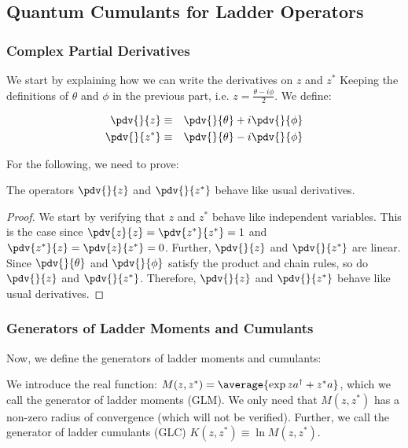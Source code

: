 \subsection{Quantum Cumulants for Ladder Operators}

\subsubsection{Complex Partial Derivatives}

We start by explaining how we can write the derivatives on $z$ and $z^*$ Keeping the definitions of $\theta$ and $\phi$ in the previous part, i.e. $z = \frac{\theta - i \phi}{2}$. We define:

\begin{eqnarray}
    \pdv{}{z} &\equiv& \pdv{}{\theta} + i \pdv{}{\phi}\\
    \pdv{}{z^*} &\equiv& \pdv{}{\theta} - i \pdv{}{\phi}
\end{eqnarray}

For the following, we need to prove:

\begin{theorem}
    The operators $\pdv{}{z}$ and $\pdv{}{z^*}$ behave like usual derivatives.
\end{theorem}

\begin{proof}
    We start by verifying that $z$ and $z^*$ behave like independent variables. This is the case since $\pdv{z}{z} = \pdv{z^*}{z^*} = 1$ and $\pdv{z^*}{z} = \pdv{z}{z^*} = 0$. Further, $\pdv{}{z}$ and $\pdv{}{z^*}$ are linear. Since $\pdv{}{\theta}$ and $\pdv{}{\phi}$ satisfy the product and chain rules, so do $\pdv{}{z}$ and $\pdv{}{z^*}$. Therefore, $\pdv{}{z}$ and $\pdv{}{z^*}$ behave like usual derivatives.
\end{proof}

\subsubsection{Generators of Ladder Moments and Cumulants}

Now, we define the generators of ladder moments and cumulants:

\begin{definition}
    We introduce the real function: $M(z, z^*) = \average{\exp{z a^\dagger + z^* a}}$, which we call the generator of ladder moments (GLM). We only need that $M(z, z^*)$ has a non-zero radius of convergence (which will not be verified). Further, we call the generator of ladder cumulants (GLC) $K(z, z^*) \equiv \ln{M(z, z^*)}$.
\end{definition}


